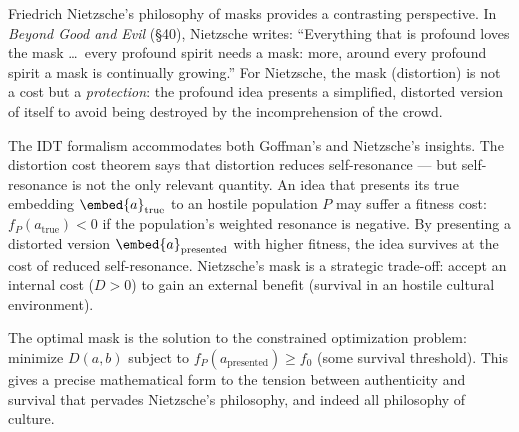 \begin{interpretation}
\label{interp:ch20:nietzsche_masks}
Friedrich Nietzsche's philosophy of masks provides a contrasting
perspective.  In \textit{Beyond Good and Evil} (\S40), Nietzsche writes:
``Everything that is profound loves the mask \ldots\ every profound spirit
needs a mask: more, around every profound spirit a mask is continually
growing.''  For Nietzsche, the mask (distortion) is not a cost but a
\emph{protection}: the profound idea presents a simplified, distorted
version of itself to avoid being destroyed by the incomprehension of
the crowd.

The IDT formalism accommodates both Goffman's and Nietzsche's insights.
The distortion cost theorem says that distortion reduces self-resonance ---
but self-resonance is not the only relevant quantity.  An idea that
presents its true embedding $\embed{a}_{\text{true}}$ to an hostile
population $P$ may suffer a fitness cost: $f_P(a_{\text{true}}) < 0$
if the population's weighted resonance is negative.  By presenting a
distorted version $\embed{a}_{\text{presented}}$ with higher fitness,
the idea survives at the cost of reduced self-resonance.  Nietzsche's
mask is a strategic trade-off: accept an internal cost ($D > 0$) to gain
an external benefit (survival in an hostile cultural environment).

The optimal mask is the solution to the constrained optimization problem:
minimize $D(a,b)$ subject to $f_P(a_{\text{presented}}) \geq f_0$ (some
survival threshold).  This gives a precise mathematical form to the
tension between authenticity and survival that pervades Nietzsche's
philosophy, and indeed all philosophy of culture.
\end{interpretation}

